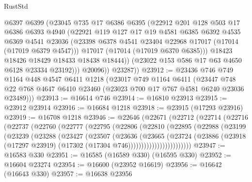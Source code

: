 \begin{lexlean}{RustStd}
\begin{coremodule}
{\begin{coremodule}
{{{{{{{{{{{{{{{{{{{{{{{{{{{{{{{{{{{{{{{{{{{{{{{{{{{{{{{                @6397
                @6399
                (@23045
                  @735
                  @17
                  @6386
                  @6395
                  (@22912
                    @201
                    @128
                    @503
                    @17
                    @6386
                    @6393
                    @4940
                    (@22921
                      @119
                      @127
                      @17
                      @19
                      @4581
                      @6385
                      @6392
                      @4535
                      @6369
                      @4541
                      @23036
                      (@23398 @6378 @4541 @23404 @22968 @17017 (@17014 (@17019 @6379 @4547)))
                      @17017
                      (@17014 (@17019 @6370 @6385)))
                    @18423
                    @18426
                    @18429
                    @18433
                    @18438
                    @18444))
                (@23022 @153 @586 @17 @63 @4650 @6128 @23334 @23192)))
            @20096))
        @23287))
@23912 := @23436
    @746
    @749
    @1164
    @448
    @4547
    @6411
    @1218
    (@23017
      @749
      @1164
      @6411
      (@23447 @748 @22 @768 @4647 @6410 @23460 (@23023 @700 @17 @767 @4581 @6240 @23036 @23489)))
@23913 := @16614 @746
@23914 := @16810 @23913
@23915 := @23912 @23914
@23916 := @16684 @1218
@23918 := @23915 (@17293 @23916)
@23919 := @16708 @1218
@23946 := @22646
    (@22671
      (@22712
        (@22714
          (@22716
            (@22737
              (@22760
                (@22777
                  (@22795
                    (@22806
                      (@22810
                        (@22895
                          (@22988
                            (@23199
                              (@23239
                                (@23288
                                  (@23427
                                    (@23507
                                      (@23636
                                        (@23665
                                          (@23724
                                            (@23886
                                              (@23918
                                                (@17297 @23919)
                                                (@17302 (@17304 @746))))))))))))))))))))))))
@23947 := @16583 @330
@23951 := @16585 (@16589 @330) (@16595 @330)
@23952 := @16604 @23274
@23954 := @16600 (@23952 @16619)
@23956 := @16642 (@16643 @330)
@23957 := @16638 @23956
}}}}}}}}}}}}}}}}}}}}}}}}}}}}}}}}}}}}}}}}}}}}}}}}}}}}}}}
\end{coremodule}}
\end{coremodule}
\end{lexlean}
